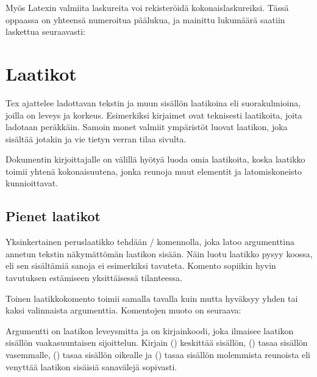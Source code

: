 Myös Latexin valmiita laskureita voi rekisteröidä kokonaislaskureiksi.
Tässä oppaassa on yhteensä  numeroitua päälukua, ja
mainittu lukumäärä saatiin laskettua seuraavasti:

\begin{koodilohkosis}
\end{koodilohkosis}

\section{Laatikot}
\label{luku/laatikot}

Tex ajattelee ladottavan tekstin ja muun sisällön laatikoina eli
suorakulmioina, joilla on leveys ja korkeus. Esimerkiksi kirjaimet ovat
teknisesti laatikoita, joita ladotaan peräkkäin. Samoin monet valmiit
ympäristöt luovat laatikon, joka sisältää jotakin ja vie tietyn verran
tilaa sivulta.

Dokumentin kirjoittajalle on välillä hyötyä luoda omia laatikoita, koska
laatikko toimii yhtenä kokonaisuutena, jonka reunoja muut elementit ja
latomiskoneisto kunnioittavat.

\subsection{Pienet laatikot}
\label{luku/laatikot-pienet}

Yksinkertainen peruslaatikko tehdään \-/ komennolla, joka
latoo argumenttina annetun tekstin näkymättömän laatikon sisään. Näin
luotu laatikko pysyy koossa, eli sen sisältämiä sanoja ei esimerkiksi
tavuteta. Komento sopiikin hyvin tavutuksen estämiseen yksittäisessä
tilanteessa.

Toinen laatikkokomento  toimii samalla tavalla kuin
 mutta hyväksyy yhden tai kaksi valinnaista argumenttia.
Komentojen muoto on seuraava:

\begin{koodilohkosis}
\end{koodilohkosis}

\noindent
Argumentti  on laatikon leveysmitta ja  on
kirjainkoodi, joka ilmaisee laatikon sisällön vaakasuuntaisen
sijoittelun. Kirjain  () keskittää sisällön,
 () tasaa sisällön vasemmalle, 
() tasaa sisällön oikealle ja 
() tasaa sisällön molemmista reunoista eli venyttää
laatikon sisäisiä sanavälejä sopivasti.

